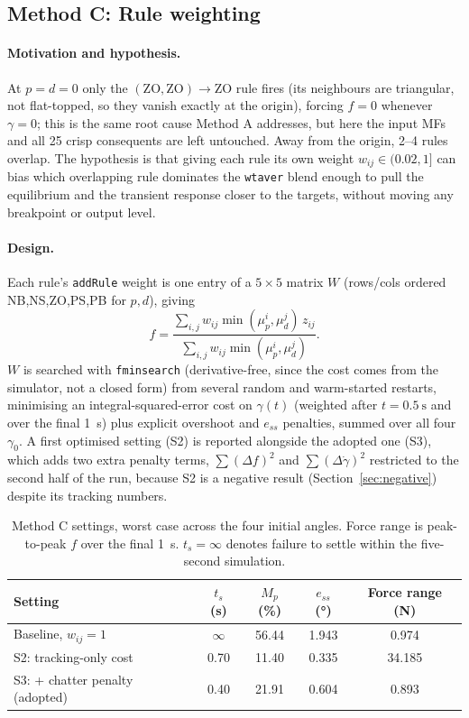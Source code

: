 \documentclass[11pt,a4paper]{article}
\newcommand{\gam}{\ensuremath{\gamma}}
\newcommand{\gamdot}{\ensuremath{\dot{\gamma}}}
\newcommand{\ts}{\ensuremath{t_s}}
\newcommand{\overshoot}{\ensuremath{M_p}}
\newcommand{\sse}{\ensuremath{e_{ss}}}
\begin{document}
\subsection{Method C: Rule weighting}
\label{sec:method-c}

\paragraph{Motivation and hypothesis.}
At $p=d=0$ only the $(\mathrm{ZO},\mathrm{ZO})\to\mathrm{ZO}$ rule fires
(its neighbours are triangular, not flat-topped, so they vanish exactly at
the origin), forcing $f=0$ whenever $\gam=0$; this is the same root cause
Method A addresses, but here the input MFs and all 25 crisp consequents are
left untouched. Away from the origin, 2--4 rules overlap. The hypothesis is
that giving each rule its own weight $w_{ij}\in(0.02,1]$ can bias which
overlapping rule dominates the \texttt{wtaver} blend enough to pull the
equilibrium and the transient response closer to the targets, without moving
any breakpoint or output level.

\paragraph{Design.}
Each rule's \texttt{addRule} weight is one entry of a $5\times5$ matrix
$W$ (rows/cols ordered NB,NS,ZO,PS,PB for $p,d$), giving
\begin{equation}
  f = \frac{\sum_{i,j} w_{ij}\min(\mu_p^i,\mu_d^j)\,z_{ij}}
           {\sum_{i,j} w_{ij}\min(\mu_p^i,\mu_d^j)}.
  \label{eq:method-c-weight}
\end{equation}
$W$ is searched with \texttt{fminsearch} (derivative-free, since the cost
comes from the simulator, not a closed form) from several random and
warm-started restarts, minimising an integral-squared-error cost on $\gam(t)$
(weighted after $t=\SI{0.5}{\s}$ and over the final \SI{1}{\s}) plus explicit
overshoot and $\sse$ penalties, summed over all four $\gam_0$. A first
optimised setting (S2) is reported alongside the adopted one (S3), which
adds two extra penalty terms, $\sum(\Delta f)^2$ and $\sum(\Delta\gamdot)^2$
restricted to the second half of the run, because S2 is a negative result
(Section~\ref{sec:negative}) despite its tracking numbers.

\begin{table}[H]
\centering
\small
\begin{tabular}{@{}lcccc@{}}
\toprule
Setting & $\ts$ (\si{\s}) & $\overshoot$ (\si{\%}) & $\sse$ (\si{\degree}) & Force range (\si{\N}) \\
\midrule
Baseline, $w_{ij}=1$ & $\infty$ & 56.44 & 1.943 & 0.974 \\
S2: tracking-only cost & 0.70 & 11.40 & 0.335 & 34.185 \\
S3: + chatter penalty (adopted) & 0.40 & 21.91 & 0.604 & 0.893 \\
\bottomrule
\end{tabular}
\caption{Method C settings, worst case across the four initial angles.
Force range is peak-to-peak $f$ over the final \SI{1}{\s}. $\ts=\infty$
denotes failure to settle within the five-second simulation.}
\label{tab:method-c}
\end{table}
\end{document}
